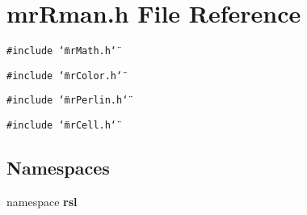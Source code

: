 \section{mr\-Rman.h File Reference}
\label{mrRman_8h}
{\tt \#include \char`\"{}mr\-Math.h\char`\"{}}\par
{\tt \#include \char`\"{}mr\-Color.h\char`\"{}}\par
{\tt \#include \char`\"{}mr\-Perlin.h\char`\"{}}\par
{\tt \#include \char`\"{}mr\-Cell.h\char`\"{}}\par
\subsection*{Namespaces}
\begin{CompactItemize}
\item 
namespace {\bf rsl}
\end{CompactItemize}
